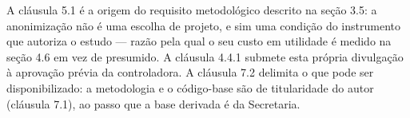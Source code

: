A cláusula 5.1 é a origem do requisito metodológico descrito na seção 3.5: a anonimização não é
uma escolha de projeto, e sim uma condição do instrumento que autoriza o estudo --- razão pela
qual o seu custo em utilidade é medido na seção 4.6 em vez de presumido. A cláusula 4.4.1
submete esta própria divulgação à aprovação prévia da controladora. A cláusula 7.2 delimita o
que pode ser disponibilizado: a metodologia e o código-base são de titularidade do autor
(cláusula 7.1), ao passo que a base derivada é da Secretaria.


